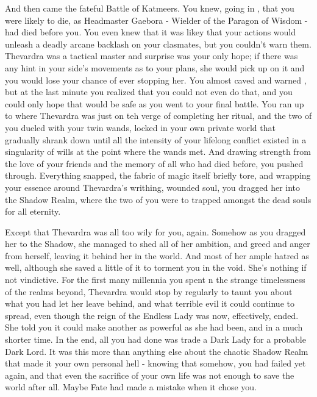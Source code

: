 \documentclass[char]{Katmeers}
\begin{document}
And then came the fateful Battle of Katmeers. You knew, going in , that you were likely to die, as Headmaster Gaebora - Wielder of the Paragon of Wisdom - had died before you. You even knew that it was likey that your actions would unleash a deadly arcane backlash on your clasmates, but you couldn't warn them. Thevardra was a tactical master and surprise was your only hope; if there was any hint in your side's movements as to your plans, she would pick up on it and you would lose your chance of ever stopping her. You almost caved and warned \cGinny{}, but at the last minute you realized that you could not even do that, and you could only hope that \cGinny{\they} would be safe as you went to your final battle. You ran up to where Thevardra was just on teh verge of completing her ritual, and the two of you  dueled with your twin wands, locked in your own private world that gradually shrank down until all the intensity of your lifelong conflict existed in a singularity of wills at the point where the wands met. And drawing strength from the love of your friends and the memory of all who had died before, you pushed through. Everything snapped, the fabric of magic itself briefly tore, and wrapping your essence around Thevardra's writhing, wounded soul, you dragged her into the Shadow Realm, where the two of you were to trapped amongst the dead souls for all eternity.

Except that Thevardra was all too wily for you, again. Somehow as you dragged her to the Shadow, she managed to shed all of her ambition, and greed and anger from herself, leaving it behind her in the world. And most of her ample hatred as well, although she saved a little of it to torment you in the void. She's nothing if not vindictive. For the first many millennia you spent n the strange timelessness of the realms beyond, Thevardra would stop by regularly to taunt you about what you had let her leave behind, and what terrible evil it could continue to spread, even though the reign of the Endless Lady was now, effectively, ended. She told you it could make another as powerful as she had been, and in a much shorter time. In the end, all you had done was trade a Dark Lady for a probable Dark Lord. It was this more than anything else about the chaotic Shadow Realm that made it your own personal hell - knowing that somehow, you had failed yet again, and that even the sacrifice of your own life was not enough to save the world after all. Maybe Fate had made a mistake when it chose you.
\end{document}
